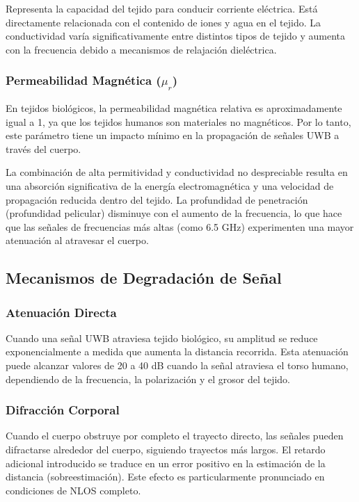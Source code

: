 Representa la capacidad del tejido para conducir corriente eléctrica. Está directamente relacionada con el contenido de iones y agua en el tejido. La conductividad varía significativamente entre distintos tipos de tejido y aumenta con la frecuencia debido a mecanismos de relajación dieléctrica.

\subsubsection{Permeabilidad Magnética ($\mu_r$)}

En tejidos biológicos, la permeabilidad magnética relativa es aproximadamente igual a 1, ya que los tejidos humanos son materiales no magnéticos. Por lo tanto, este parámetro tiene un impacto mínimo en la propagación de señales UWB a través del cuerpo.

La combinación de alta permitividad y conductividad no despreciable resulta en una absorción significativa de la energía electromagnética y una velocidad de propagación reducida dentro del tejido. La profundidad de penetración (profundidad pelicular) disminuye con el aumento de la frecuencia, lo que hace que las señales de frecuencias más altas (como 6.5 GHz) experimenten una mayor atenuación al atravesar el cuerpo.

\subsection{Mecanismos de Degradación de Señal}

\subsubsection{Atenuación Directa}

Cuando una señal UWB atraviesa tejido biológico, su amplitud se reduce exponencialmente a medida que aumenta la distancia recorrida. Esta atenuación puede alcanzar valores de 20 a 40 dB cuando la señal atraviesa el torso humano, dependiendo de la frecuencia, la polarización y el grosor del tejido.

\subsubsection{Difracción Corporal}

Cuando el cuerpo obstruye por completo el trayecto directo, las señales pueden difractarse alrededor del cuerpo, siguiendo trayectos más largos. El retardo adicional introducido se traduce en un error positivo en la estimación de la distancia (sobreestimación). Este efecto es particularmente pronunciado en condiciones de NLOS completo.

